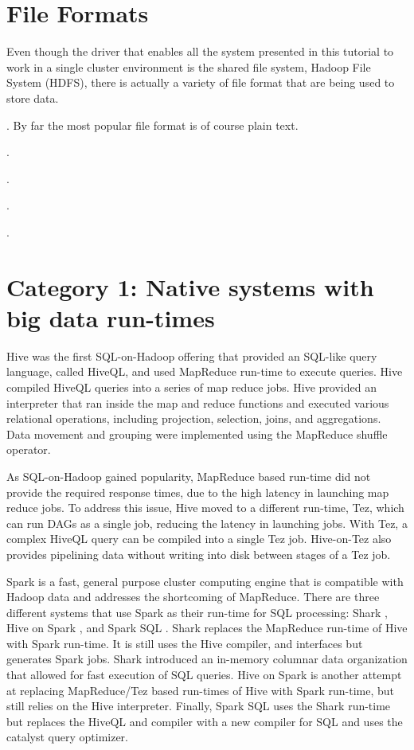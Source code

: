 \documentclass{vldb}
\begin{document}
\section{File Formats}

Even though the driver that enables all the system presented in this tutorial to work in a single cluster environment is the shared file system, Hadoop File System (HDFS), there is actually a variety of file format that are being used to store data. 

. By far the most popular file format is of course plain text.

\vspace{2mm}
.

\vspace{2mm}
.

\vspace{2mm}
.

\vspace{2mm}
.

\section{Category 1: Native systems with big data run-times}

Hive \cite{hive} was the first SQL-on-Hadoop offering that provided an SQL-like query language, called HiveQL, and used MapReduce run-time to execute queries. Hive compiled HiveQL queries into a series of map reduce jobs. Hive provided an interpreter that ran inside the map and reduce functions and executed various relational operations, including projection, selection, joins, and aggregations. Data movement and grouping were implemented using the MapReduce shuffle operator.

As SQL-on-Hadoop gained popularity, MapReduce based run-time did not provide the required response times, due to the high latency in launching map reduce jobs. To address this issue, Hive moved to a different run-time, Tez, which can run DAGs as a single job, reducing the latency in launching jobs. With Tez, a complex HiveQL query can be compiled into a single Tez job. Hive-on-Tez also provides pipelining data without writing into disk between stages of a Tez job.

Spark is a fast, general purpose cluster computing engine that is compatible with Hadoop data and addresses the shortcoming of MapReduce. There are three different systems that use Spark as their run-time for SQL processing: Shark \cite{sharksigmod13}, Hive on Spark \cite{hiveOnSpark}, and Spark SQL \cite{sparkSQL}. Shark replaces the MapReduce run-time of Hive \cite{hive} with Spark run-time. It is still uses the Hive compiler, and interfaces but generates Spark jobs. Shark introduced an in-memory columnar data organization that allowed for fast execution of SQL queries. Hive on Spark is another attempt at replacing MapReduce/Tez based run-times of Hive with Spark run-time, but still relies on the Hive interpreter. Finally, Spark SQL uses the Shark \cite{sharksigmod13} run-time but replaces the HiveQL and compiler with a new compiler for SQL and uses the catalyst query optimizer.
\end{document}
